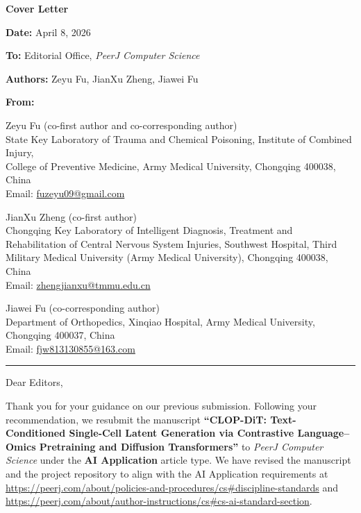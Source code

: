 \documentclass[11pt,letterpaper]{article}
\title{}
\author{}
\date{}
\begin{document}
\noindent
{\Large\bfseries Cover Letter\par}
\vspace{0.8em}

\noindent\textbf{Date:} April 8, 2026

\noindent\textbf{To:} Editorial Office, \emph{PeerJ Computer Science}

\noindent\textbf{Authors:} Zeyu Fu, JianXu Zheng, Jiawei Fu

\vspace{0.6em}
\noindent\textbf{From:}

\noindent Zeyu Fu (co-first author and co-corresponding author)\\
State Key Laboratory of Trauma and Chemical Poisoning, Institute of Combined Injury,\\
College of Preventive Medicine, Army Medical University, Chongqing 400038, China\\
Email: \href{mailto:fuzeyu09@gmail.com}{fuzeyu09@gmail.com}

\vspace{0.4em}
\noindent JianXu Zheng (co-first author)\\
Chongqing Key Laboratory of Intelligent Diagnosis, Treatment and Rehabilitation of Central Nervous System Injuries, Southwest Hospital, Third Military Medical University (Army Medical University), Chongqing 400038, China\\
Email: \href{mailto:zhengjianxu@tmmu.edu.cn}{zhengjianxu@tmmu.edu.cn}

\vspace{0.4em}
\noindent Jiawei Fu (co-corresponding author)\\
Department of Orthopedics, Xinqiao Hospital, Army Medical University, Chongqing 400037, China\\
Email: \href{mailto:fjw813130855@163.com}{fjw813130855@163.com}

\vspace{0.8em}
\hrule
\vspace{0.8em}

\noindent Dear Editors,

Thank you for your guidance on our previous submission. Following your recommendation, we resubmit the manuscript \textbf{``CLOP-DiT: Text-Conditioned Single-Cell Latent Generation via Contrastive Language--Omics Pretraining and Diffusion Transformers''} to \emph{PeerJ Computer Science} under the \textbf{AI Application} article type. We have revised the manuscript and the project repository to align with the AI Application requirements at \url{https://peerj.com/about/policies-and-procedures/cs#discipline-standards} and \url{https://peerj.com/about/author-instructions/cs#cs-ai-standard-section}.
\end{document}
